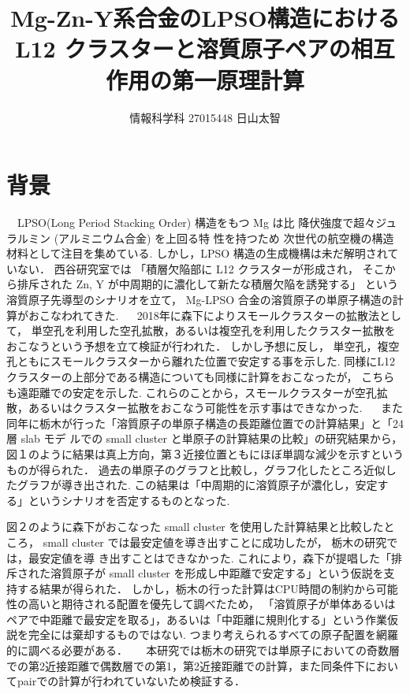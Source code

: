 \documentclass[a4j,twocolumn]{jsarticle}
\begin{document}
\title{Mg-Zn-Y系合金のLPSO構造におけるL12 クラスターと溶質原子ペアの相互作用の第一原理計算}
\author{情報科学科 \hspace{5mm} 27015448 \hspace{5mm} 日山太智}
\date{}
\maketitle

\section{背景}


　LPSO(Long Period Stacking Order) 構造をもつ 
Mg は比 降伏強度で超々ジュラルミン (アルミニウム合金) を上回る特 性を持つため
次世代の航空機の構造材料として注目を集めている.
しかし，LPSO 構造の生成機構は未だ解明されていない．
西谷研究室では
「積層欠陥部に L12 クラスターが形成され，
そこから排斥された Zn, Y が中周期的に濃化して新たな積層欠陥を誘発する」
という溶質原子先導型のシナリオを立て，
Mg-LPSO 合金の溶質原子の単原子構造の計算がおこなわれてきた.
　
2018年に森下によりスモールクラスターの拡散法として，
単空孔を利用した空孔拡散，あるいは複空孔を利用したクラスター拡散をおこなうという予想を立て検証が行われた．
しかし予想に反し， 単空孔，複空孔ともにスモールクラスターから離れた位置で安定する事を示した.
同様にL12 クラスターの上部分である構造についても同様に計算をおこなったが，
こちらも遠距離での安定を示した.
これらのことから，スモールクラスターが空孔拡散，あるいはクラスター拡散をおこなう可能性を示す事はできなかった\cite{donkey}.
　
また同年に栃木が行った「溶質原子の単原子構造の長距離位置での計算結果」と「24 層 slab モデ ルでの small cluster と単原子の計算結果の比較」の研究結果から，
図１のように結果は真上方向，第３近接位置ともにほぼ単調な減少を示すというものが得られた．
過去の単原子のグラフと比較し，グラフ化したところ近似したグラフが導き出された.
この結果は「中周期的に溶質原子が濃化し，安定する」というシナリオを否定するものとなった\cite{tochigi}.

図２のように森下がおこなった small cluster を使用した計算結果と比較したところ，
small cluster では最安定値を導き出すことに成功したが，
栃木の研究では，最安定値を導 き出すことはできなかった.
これにより，森下が提唱した「排斥された溶質原子が small cluster を形成し中距離で安定する」という仮説を支持する結果が得られた\cite{donkey}．
しかし，栃木の行った計算はCPU時間の制約から可能性の高いと期待される配置を優先して調べたため，
「溶質原子が単体あるいはペアで中距離で最安定を取る」，あるいは「中距離に規則化する」という作業仮説を完全には棄却するものではない\cite{tochigi}.
つまり考えられるすべての原子配置を網羅的に調べる必要がある．
　
本研究では栃木の研究では単原子においての奇数層での第2近接距離で偶数層での第1，第2近接距離での計算，また同条件下においてpairでの計算が行われていないため検証する．
\end{document}
